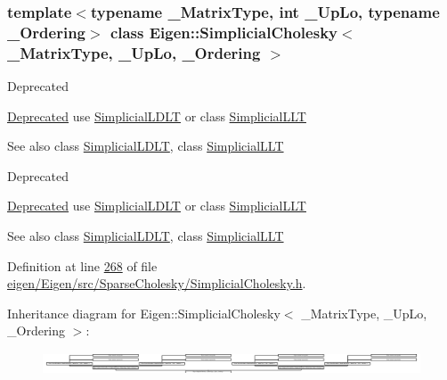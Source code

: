 \subsubsection*{template$<$typename \+\_\+\+Matrix\+Type, int \+\_\+\+Up\+Lo, typename \+\_\+\+Ordering$>$\newline
class Eigen\+::\+Simplicial\+Cholesky$<$ \+\_\+\+Matrix\+Type, \+\_\+\+Up\+Lo, \+\_\+\+Ordering $>$}

\begin{DoxyRefDesc}{Deprecated}
\item[\hyperlink{deprecated__deprecated000036}{Deprecated}]use \hyperlink{group___sparse_cholesky___module_class_eigen_1_1_simplicial_l_d_l_t}{Simplicial\+L\+D\+LT} or class \hyperlink{group___sparse_cholesky___module_class_eigen_1_1_simplicial_l_l_t}{Simplicial\+L\+LT}\end{DoxyRefDesc}
\begin{DoxySeeAlso}{See also}
class \hyperlink{group___sparse_cholesky___module_class_eigen_1_1_simplicial_l_d_l_t}{Simplicial\+L\+D\+LT}, class \hyperlink{group___sparse_cholesky___module_class_eigen_1_1_simplicial_l_l_t}{Simplicial\+L\+LT}
\end{DoxySeeAlso}
\begin{DoxyRefDesc}{Deprecated}
\item[\hyperlink{deprecated__deprecated000080}{Deprecated}]use \hyperlink{group___sparse_cholesky___module_class_eigen_1_1_simplicial_l_d_l_t}{Simplicial\+L\+D\+LT} or class \hyperlink{group___sparse_cholesky___module_class_eigen_1_1_simplicial_l_l_t}{Simplicial\+L\+LT}\end{DoxyRefDesc}
\begin{DoxySeeAlso}{See also}
class \hyperlink{group___sparse_cholesky___module_class_eigen_1_1_simplicial_l_d_l_t}{Simplicial\+L\+D\+LT}, class \hyperlink{group___sparse_cholesky___module_class_eigen_1_1_simplicial_l_l_t}{Simplicial\+L\+LT} 
\end{DoxySeeAlso}


Definition at line \hyperlink{eigen_2_eigen_2src_2_sparse_cholesky_2_simplicial_cholesky_8h_source_l00268}{268} of file \hyperlink{eigen_2_eigen_2src_2_sparse_cholesky_2_simplicial_cholesky_8h_source}{eigen/\+Eigen/src/\+Sparse\+Cholesky/\+Simplicial\+Cholesky.\+h}.

Inheritance diagram for Eigen\+:\+:Simplicial\+Cholesky$<$ \+\_\+\+Matrix\+Type, \+\_\+\+Up\+Lo, \+\_\+\+Ordering $>$\+:\begin{figure}[H]
\begin{center}
\leavevmode
\includegraphics[height=0.665399cm]{group___sparse_cholesky___module}
\end{center}
\end{figure}
